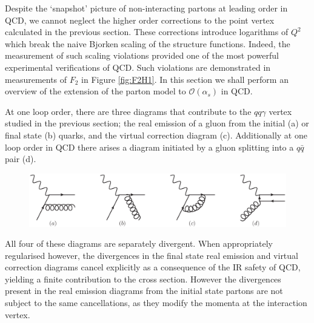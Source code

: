Despite the `snapshot' picture of non-interacting partons at leading order in QCD, we cannot neglect the higher order corrections to the point vertex calculated in the previous section. These corrections introduce logarithms of $Q^2$ which break the naive Bjorken scaling of the structure functions. Indeed, the measurement of such scaling violations provided one of the most powerful experimental verifications of QCD. Such violations are demonstrated in measurements of $F_2$ in Figure \ref{fig:F2H1}. In this section we shall perform an overview of the extension of the parton model to $\mathcal{O}(\alpha_s)$ in QCD.

At one loop order, there are three diagrams that contribute to the $qq\gamma$ vertex studied in the previous section; the real emission of a gluon from the initial (a) or final state (b) quarks, and the virtual correction diagram (c). Additionally at one loop order in QCD there arises a diagram initiated by a gluon splitting into a $q\bar{q}$ pair (d).

\begin{figure}[ht]
\centering
\includegraphics[scale=0.6]{2-PDFs/figs/1loopDIS.eps}
\end{figure}

All four of these diagrams are separately divergent. When appropriately regularised however, the divergences in the final state real emission and virtual correction diagrams cancel explicitly as a consequence of the IR safety of QCD, yielding a finite contribution to the cross section. However the divergences present in the real emission diagrams from the initial state partons are not subject to the same cancellations, as they modify the momenta at the interaction vertex. 
 
